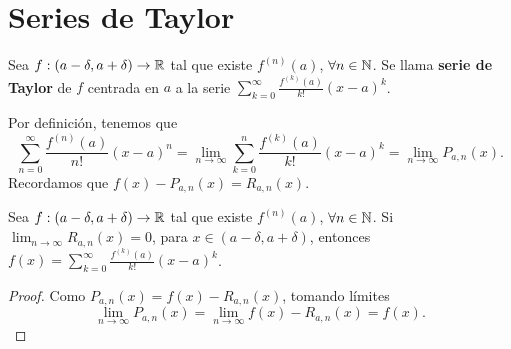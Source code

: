 \section{Series de Taylor}
\begin{fdefinition}
\normalfont Sea $\displaystyle f : \left(a-\delta, a + \delta \right)\to \mathbb{R} $ tal que existe $\displaystyle f^{\left(n\right)}\left(a\right) $, $\displaystyle \forall n \in \mathbb{N} $. Se llama \textbf{serie de Taylor} de $\displaystyle f $ centrada en $\displaystyle a $ a la serie $\displaystyle \sum^{\infty}_{k = 0}\frac{f^{\left(k\right)}\left(a\right)}{k!}\left(x-a\right)^{k} $.
\end{fdefinition}
\begin{observation}
\normalfont Por definición, tenemos que 
\[\sum^{\infty}_{n=0}\frac{f^{\left(n\right)}\left(a\right)}{n!}\left(x-a\right)^{n}=\lim_{n \to \infty}\sum^{n}_{k=0}\frac{f^{\left(k\right)}\left(a\right)}{k!}\left(x-a\right)^{k} = \lim_{n \to \infty}P_{a,n}\left(x\right) .\]
Recordamos que $\displaystyle f\left(x\right)-P_{a,n}\left(x\right) = R_{a,n}\left(x\right) $.
\end{observation}
\begin{fprop}[]
\normalfont Sea $\displaystyle f : \left(a-\delta, a + \delta \right)\to \mathbb{R} $ tal que existe $\displaystyle f^{\left(n\right)} \left(a\right)$, $\displaystyle \forall n \in \mathbb{N} $. Si $\displaystyle \lim_{n \to \infty}R_{a,n}\left(x\right) = 0 $, para $\displaystyle x \in \left(a-\delta, a + \delta \right) $, entonces $\displaystyle f\left(x\right)= \sum^{\infty}_{k=0}\frac{f^{\left(k\right)}\left(a\right)}{k!}\left(x-a\right)^{k} $.
\end{fprop}
\begin{proof}
Como $\displaystyle P_{a,n}\left(x\right) = f\left(x\right)-R_{a,n}\left(x\right) $, tomando límites
\[\lim_{n \to \infty}P_{a,n}\left(x\right) = \lim_{n \to \infty}f\left(x\right)-R_{a,n}\left(x\right) =f\left(x\right) .\]
\end{proof}
